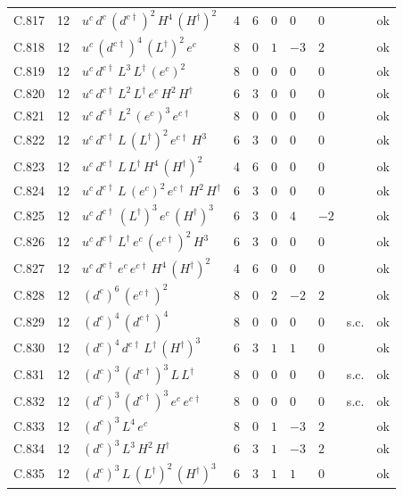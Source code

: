 {\begin{longtable}{@{}ll>{\raggedright\arraybackslash}p{6.4cm}rrllllr@{}}
C.817 & 12 & $u^c\,d^c\,(d^{c\dagger})^{2}\,H^{4}\,(H^\dagger)^{2}$ & 4 & 6 & $0$ & $0$ & $0$ &  & ok \\
C.818 & 12 & $u^c\,(d^{c\dagger})^{4}\,(L^\dagger)^{2}\,e^c$ & 8 & 0 & $1$ & $-3$ & $2$ &  & ok \\
C.819 & 12 & $u^c\,d^{c\dagger}\,L^{3}\,L^\dagger\,(e^c)^{2}$ & 8 & 0 & $0$ & $0$ & $0$ &  & ok \\
C.820 & 12 & $u^c\,d^{c\dagger}\,L^{2}\,L^\dagger\,e^c\,H^{2}\,H^\dagger$ & 6 & 3 & $0$ & $0$ & $0$ &  & ok \\
C.821 & 12 & $u^c\,d^{c\dagger}\,L^{2}\,(e^c)^{3}\,e^{c\dagger}$ & 8 & 0 & $0$ & $0$ & $0$ &  & ok \\
C.822 & 12 & $u^c\,d^{c\dagger}\,L\,(L^\dagger)^{2}\,e^{c\dagger}\,H^{3}$ & 6 & 3 & $0$ & $0$ & $0$ &  & ok \\
C.823 & 12 & $u^c\,d^{c\dagger}\,L\,L^\dagger\,H^{4}\,(H^\dagger)^{2}$ & 4 & 6 & $0$ & $0$ & $0$ &  & ok \\
C.824 & 12 & $u^c\,d^{c\dagger}\,L\,(e^c)^{2}\,e^{c\dagger}\,H^{2}\,H^\dagger$ & 6 & 3 & $0$ & $0$ & $0$ &  & ok \\
C.825 & 12 & $u^c\,d^{c\dagger}\,(L^\dagger)^{3}\,e^c\,(H^\dagger)^{3}$ & 6 & 3 & $0$ & $4$ & $-2$ &  & ok \\
C.826 & 12 & $u^c\,d^{c\dagger}\,L^\dagger\,e^c\,(e^{c\dagger})^{2}\,H^{3}$ & 6 & 3 & $0$ & $0$ & $0$ &  & ok \\
C.827 & 12 & $u^c\,d^{c\dagger}\,e^c\,e^{c\dagger}\,H^{4}\,(H^\dagger)^{2}$ & 4 & 6 & $0$ & $0$ & $0$ &  & ok \\
C.828 & 12 & $(d^c)^{6}\,(e^{c\dagger})^{2}$ & 8 & 0 & $2$ & $-2$ & $2$ &  & ok \\
C.829 & 12 & $(d^c)^{4}\,(d^{c\dagger})^{4}$ & 8 & 0 & $0$ & $0$ & $0$ & s.c. & ok \\
C.830 & 12 & $(d^c)^{4}\,d^{c\dagger}\,L^\dagger\,(H^\dagger)^{3}$ & 6 & 3 & $1$ & $1$ & $0$ &  & ok \\
C.831 & 12 & $(d^c)^{3}\,(d^{c\dagger})^{3}\,L\,L^\dagger$ & 8 & 0 & $0$ & $0$ & $0$ & s.c. & ok \\
C.832 & 12 & $(d^c)^{3}\,(d^{c\dagger})^{3}\,e^c\,e^{c\dagger}$ & 8 & 0 & $0$ & $0$ & $0$ & s.c. & ok \\
C.833 & 12 & $(d^c)^{3}\,L^{4}\,e^c$ & 8 & 0 & $1$ & $-3$ & $2$ &  & ok \\
C.834 & 12 & $(d^c)^{3}\,L^{3}\,H^{2}\,H^\dagger$ & 6 & 3 & $1$ & $-3$ & $2$ &  & ok \\
C.835 & 12 & $(d^c)^{3}\,L\,(L^\dagger)^{2}\,(H^\dagger)^{3}$ & 6 & 3 & $1$ & $1$ & $0$ &  & ok \\

\end{longtable}}
